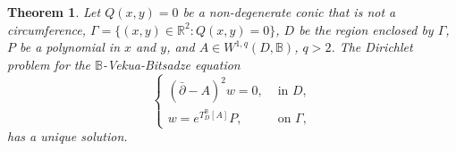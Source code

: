 \documentclass[12pt,reqno]{amsart}
\newtheorem{theorem}{Theorem}[section]
\theoremstyle{definition}
\theoremstyle{remark}
\newcommand{\dbar}{\bar\partial}
\newcommand{\bc}{\mathbb{B}}
\begin{document}
        \begin{theorem}\label{thm: bcmainthm}
        Let $Q(x,y) = 0$ be a non-degenerate conic that is not a circumference, $\Gamma = \{(x,y) \in \mathbb{R}^2 : Q(x,y) = 0\}$, $D$ be the region enclosed by $\Gamma$, $P$ be a polynomial in $x$ and $y$, and $A \in W^{1,q}(D,\bc)$, $q>2$. The Dirichlet problem for the $\bc$-Vekua-Bitsadze equation
        \begin{equation}\label{eq: vekbitdirwellposed}
            \begin{cases}
                \left( \dbar - A \right)^2 w = 0, & \text{ in } D,\\
                w = e^{T_D^\bc[A]}P, & \text{ on } \Gamma,
            \end{cases}
        \end{equation}
        has a unique solution. 
    \end{theorem}
\end{document}
